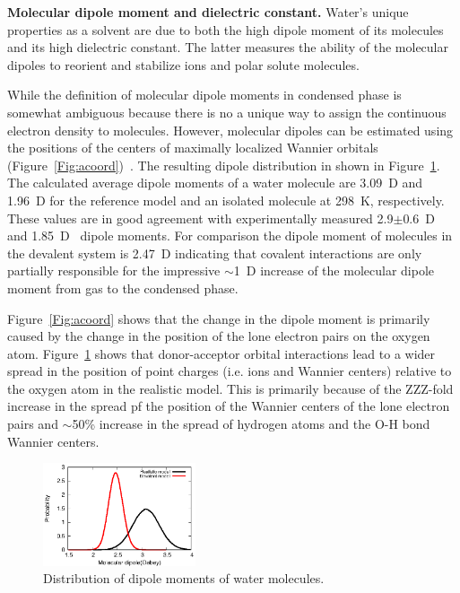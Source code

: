\documentclass[aps,prl,reprint,amsmath,amssymb]{revtex4-1}
\begin{document}
\textbf{Molecular dipole moment and dielectric constant.} Water's unique properties as a solvent are due to both the high dipole moment of its molecules and its high dielectric constant. 
The latter measures the ability of the molecular dipoles to reorient and stabilize ions and polar solute molecules. 

While the definition of molecular dipole moments in condensed phase is somewhat ambiguous because there is no a unique way to assign the continuous electron density to molecules. 
However, molecular dipoles can be estimated using the positions of the centers of maximally localized Wannier orbitals (Figure~\ref{Fig:acoord})~\cite{marzari1997maximally,sharma2007dipolar}. 
The resulting dipole distribution in shown in Figure~\ref{Fig:dipoledist}. 
The calculated average dipole moments of a water molecule are 3.09~D and 1.96~D for the reference model and an isolated molecule at 298~K, respectively. These values are in good agreement with experimentally measured 2.9$\pm$0.6~D~\cite{badyal2000electron} and 1.85~D~\cite{haynes2014crc} dipole moments. For comparison the dipole moment of molecules in the devalent system is 2.47~D indicating that covalent interactions are only partially responsible for the impressive $\sim$1~D increase of the molecular dipole moment from gas to the condensed phase. 

Figure~\ref{Fig:acoord} shows that the change in the dipole moment is primarily caused by the change in the position of the lone electron pairs on the oxygen atom. 
Figure~\ref{Fig:dipoledist} shows that donor-acceptor orbital interactions lead to a wider spread in the position of point charges (i.e. ions and Wannier centers) relative to the oxygen atom in the realistic model. 
This is primarily because of the ZZZ-fold increase in the spread pf the position of the Wannier centers of the lone electron pairs and  
$\sim$50\% increase in the spread of hydrogen atoms and the O-H bond Wannier centers.

\begin{figure}
\includegraphics[width=0.4\textwidth]{new_dipole}
\caption{Distribution of dipole moments of water molecules.} \label{Fig:dipoledist}
\end{figure}
\end{document}
